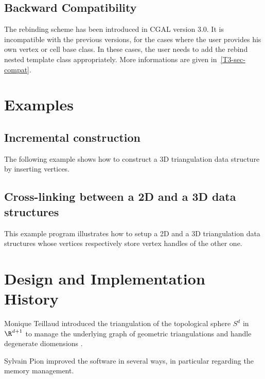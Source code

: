 \subsection{Backward Compatibility}
The rebinding scheme has been introduced in CGAL version 3.0.  It is
incompatible with the previous versions, for the cases where the user provides
his own vertex or cell base class.  In these cases, the user needs to add
the rebind nested template class appropriately.  More informations are given
in~\ref{T3-sec-compat}.

\section{Examples}
\label{TDS3-sec-examples}

\subsection{Incremental construction}
The following example shows how to construct a 3D triangulation data
structure by inserting vertices.


\subsection{Cross-linking between a 2D and a 3D data structures}
This example program illustrates how to setup a 2D and a 3D triangulation data
structures whose vertices respectively store vertex handles of the other one.


\section{Design and Implementation History}

Monique Teillaud introduced the triangulation of the topological
sphere $S^d$ in $\R^{d+1}$ to manage the underlying graph of geometric
triangulations and handle degenerate diomensions \cite{t-tdtc-99}. 

Sylvain Pion improved the software in several ways, in particular
regarding the memory management.
